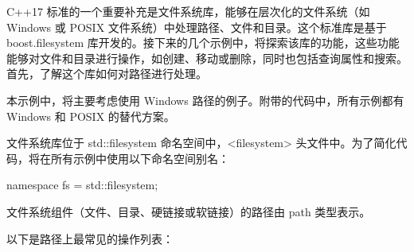 C++17 标准的一个重要补充是文件系统库，能够在层次化的文件系统（如 Windows 或 POSIX 文件系统）中处理路径、文件和目录。这个标准库是基于 boost.filesystem 库开发的。接下来的几个示例中，将探索该库的功能，这些功能能够对文件和目录进行操作，如创建、移动或删除，同时也包括查询属性和搜索。首先，了解这个库如何对路径进行处理。


本示例中，将主要考虑使用 Windows 路径的例子。附带的代码中，所有示例都有 Windows 和 POSIX 的替代方案。

文件系统库位于 std::filesystem 命名空间中，<filesystem> 头文件中。为了简化代码，将在所有示例中使用以下命名空间别名：

\begin{cpp}
namespace fs = std::filesystem;
\end{cpp}

文件系统组件（文件、目录、硬链接或软链接）的路径由 path 类型表示。


以下是路径上最常见的操作列表：


